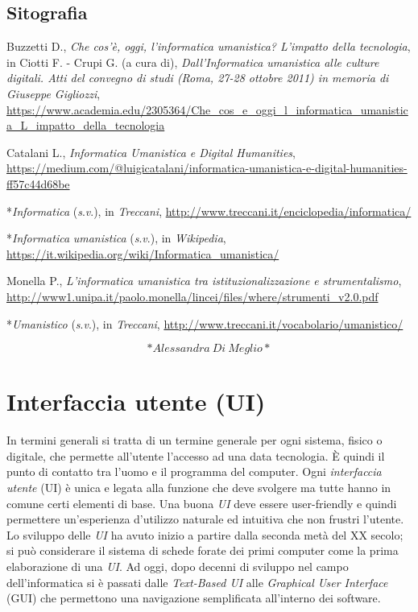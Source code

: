 \documentclass[
  b5paper,
  twoside,
  12pt,
  chapterprefix=false,
  bibliography=totocnumbered,
  parskip=false]{scrbook}
\begin{document}
\hypertarget{sitografia-19}{%
\section*{Sitografia}\label{sitografia-19}}

Buzzetti D., \emph{Che cos'è, oggi, l'informatica umanistica? L'impatto della
tecnologia}, in Ciotti F. - Crupi G. (a cura di), \emph{Dall'Informatica
umanistica alle culture digitali. Atti del convegno di studi (Roma,
27-28 ottobre 2011) in memoria di Giuseppe Gigliozzi},
\url{https://www.academia.edu/2305364/Che_cos_e_oggi_l_informatica_umanistica_L_impatto_della_tecnologia}

Catalani L., \emph{Informatica Umanistica e Digital Humanities},
\url{https://medium.com/@luigicatalani/informatica-umanistica-e-digital-humanities-ff57c44d68be}

*\emph{Informatica} (\emph{s}.\emph{v}.), in \emph{Treccani},
\url{http://www.treccani.it/enciclopedia/informatica/}

*\emph{Informatica} \emph{umanistica} (\emph{s}.\emph{v}.), in \emph{Wikipedia},
\url{https://it.wikipedia.org/wiki/Informatica_umanistica/}

Monella P., \emph{L'informatica umanistica tra istituzionalizzazione e
strumentalismo},
\url{http://www1.unipa.it/paolo.monella/lincei/files/where/strumenti_v2.0.pdf}

*\emph{Umanistico} (\emph{s}.\emph{v}.), in \emph{Treccani},
\url{http://www.treccani.it/vocabolario/umanistico/}

\[*Alessandra~Di~Meglio*\]

\hypertarget{interfaccia-utente-ui}{%
\chapter{Interfaccia utente (UI)}\label{interfaccia-utente-ui}}

In termini generali si tratta di un termine generale per ogni sistema,
fisico o digitale, che permette all'utente l'accesso ad una data
tecnologia. È quindi il punto di contatto tra l'uomo e il programma del
computer. Ogni \emph{interfaccia utente} (UI) è unica e legata alla funzione
che deve svolgere ma tutte hanno in comune certi elementi di base. Una
buona \emph{UI} deve essere user-friendly e quindi permettere un'esperienza
d'utilizzo naturale ed intuitiva che non frustri l'utente. Lo sviluppo
delle \emph{UI} ha avuto inizio a partire dalla seconda metà del XX secolo;
si può considerare il sistema di schede forate dei primi computer come
la prima elaborazione di una \emph{UI}. Ad oggi, dopo decenni di sviluppo nel
campo dell'informatica si è passati dalle \emph{Text-Based UI} alle
\emph{Graphical User Interface} (GUI) che permettono una navigazione
semplificata all'interno dei software.
\end{document}
